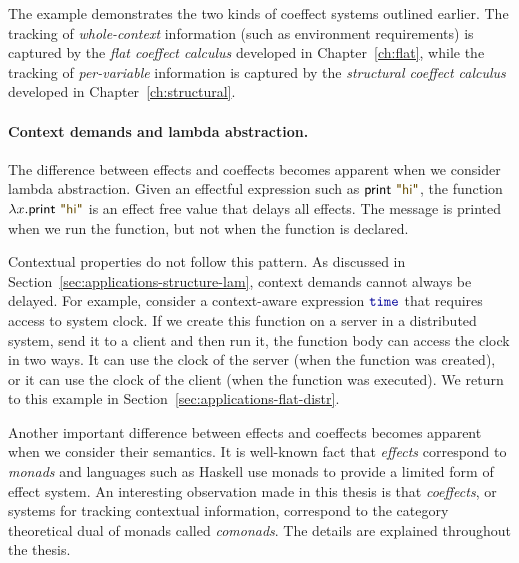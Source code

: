 The example demonstrates the two kinds of coeffect systems outlined earlier. The tracking of
\emph{whole-context} information (such as environment requirements) is captured by the \emph{flat
coeffect calculus} developed in Chapter~\ref{ch:flat}, while the tracking of \emph{per-variable}
information is captured by the \emph{structural coeffect calculus} developed in Chapter~\ref{ch:structural}.

\paragraph{Context demands and lambda abstraction.}
The difference between effects and coeffects becomes apparent when we consider lambda abstraction.
Given an effectful expression such as $\ident{print}~\str{hi}$, the function $\lambda x.\ident{print}~\str{hi}$
is an effect free value that delays all effects. The message is printed when we run the function,
but not when the function is declared.

Contextual properties do not follow this pattern. As discussed in 
Section~\ref{sec:applications-structure-lam}, context demands cannot always be delayed. For 
example, consider a context-aware expression $\kvd{time}$ that requires access to system clock.
If we create this function on a server in a distributed system, send it to a client and then
run it, the function body can access the clock in two ways. It can use the clock of the server (when the
function was created), or it can use the clock of the client (when the function was executed).
We return to this example in Section~\ref{sec:applications-flat-distr}.

Another important difference between effects and coeffects becomes apparent when we consider their
semantics. It is well-known fact that \emph{effects} correspond to \emph{monads} and languages such as Haskell
use monads to provide a limited form of effect system. An interesting observation made in this thesis
is that \emph{coeffects}, or systems for tracking contextual information, correspond to the category
theoretical dual of monads called \emph{comonads}. The details are explained throughout the thesis.


%
%

